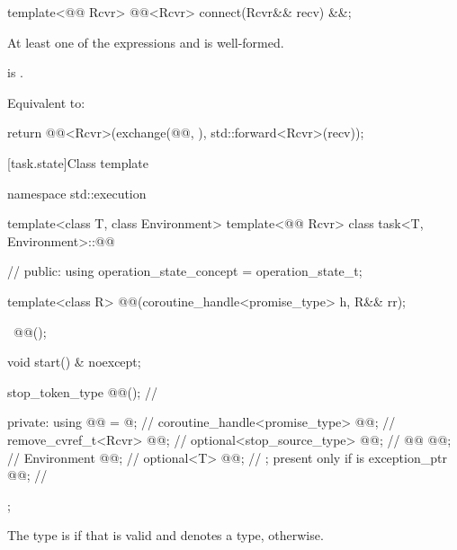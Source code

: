 %
\begin{itemdecl}
template<@@ Rcvr>
  @@<Rcvr> connect(Rcvr&& recv) &&;
\end{itemdecl}
\begin{itemdescr}
\pnum
\mandates
At least one of the expressions
 and
is well-formed.

\pnum
\expects
{} is .

\pnum
\effects
Equivalent to:
\begin{codeblock}
return @@<Rcvr>(exchange(@@, {}), std::forward<Rcvr>(recv));
\end{codeblock}
\end{itemdescr}

[task.state]{Class template }

\begin{codeblock}
namespace std::execution {
  template<class T, class Environment>
  template<@@ Rcvr>
  class task<T, Environment>::@@ {           // \expos
  public:
    using operation_state_concept = operation_state_t;

    template<class R>
      @@(coroutine_handle<promise_type> h, R&& rr);

    ~@@();

    void start() & noexcept;

    stop_token_type @@();           // \expos

  private:
    using @@ = @\seebelownc@;                // \expos
    coroutine_handle<promise_type> @@;      // \expos
    remove_cvref_t<Rcvr>           @@;        // \expos
    optional<stop_source_type>     @@;      // \expos
    @@                      @@;     // \expos
    Environment                    @@; // \expos
    optional<T>                    @@;      // \expos; present only if  is 
    exception_ptr                  @@;       // \expos
  };
}
\end{codeblock}

\pnum
The type  is  if that
 is valid and denotes a type,  otherwise.

